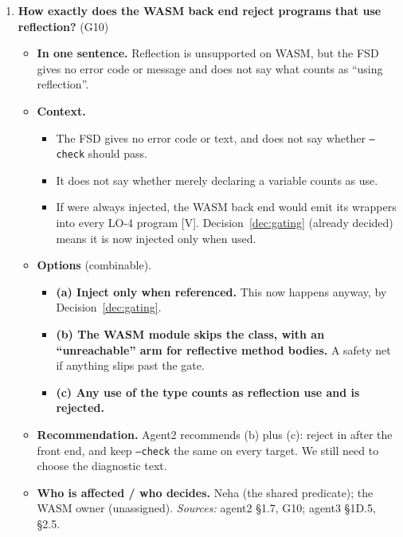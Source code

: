 \documentclass[10pt]{article}
\newcommand{\code}[1]{\texttt{\small #1}}
\newcommand{\mV}{\textsf{\scriptsize[V]}}
\newcommand{\field}[1]{\textbf{#1}\enspace}
\newcommand{\decitem}[1]{\needspace{6\baselineskip}\setcounter{enumi}{\numexpr#1-1\relax}\item}
\begin{document}
\begin{enumerate}[label=\textbf{\arabic*.},ref=\arabic*,leftmargin=1.8em,itemsep=0.8em]
\decitem{14}\label{dec:wasm}\textbf{How exactly does the WASM back end reject programs that use reflection?} (G10)
\begin{itemize}
\item[] \field{In one sentence.} Reflection is unsupported on WASM, but the FSD gives no error code or message and does not say what counts as ``using reflection''.
\item[] \field{Context.}
\begin{itemize}
\item The FSD gives no error code or text, and does not say whether \code{--check} should pass.
\item It does not say whether merely declaring a  variable counts as use.
\item If  were always injected, the WASM back end would emit its wrappers into every LO-4 program \mV. Decision~\ref{dec:gating} (already decided) means it is now injected only when used.
\end{itemize}
\item[] \field{Options} (combinable).
\begin{itemize}
\item \textbf{(a) Inject  only when referenced.} This now happens anyway, by Decision~\ref{dec:gating}.
\item \textbf{(b) The WASM module skips the  class, with an ``unreachable'' arm for reflective method bodies.} A safety net if anything slips past the gate.
\item \textbf{(c) Any use of the  type counts as reflection use and is rejected.}
\end{itemize}
\item[] \field{Recommendation.} Agent2 recommends (b) plus (c): reject in  after the front end, and keep \code{--check} the same on every target. We still need to choose the diagnostic text.
\item[] \field{Who is affected / who decides.} Neha (the shared predicate); the WASM owner (unassigned). \emph{Sources:} agent2 §1.7, G10; agent3 §1D.5, §2.5.
\end{itemize}


\end{enumerate}
\end{document}
